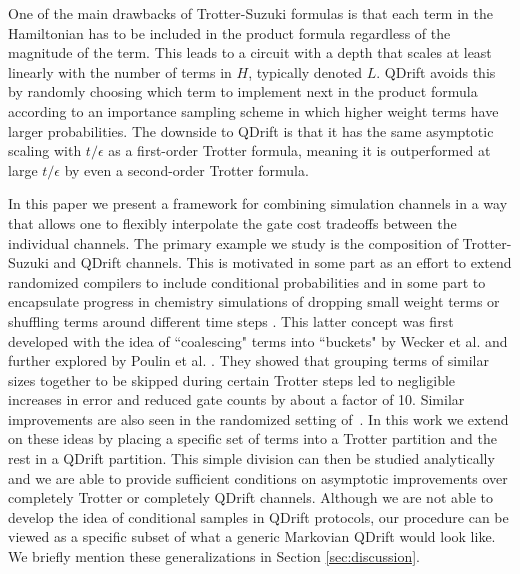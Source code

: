 One of the main drawbacks of Trotter-Suzuki formulas is that each term in the Hamiltonian has to be included in the product formula regardless of the magnitude of the term.  This leads
to a circuit with a depth that scales at least linearly with the number of terms in $H$, typically denoted $L$. QDrift avoids this by randomly choosing which
term to implement next in the product formula according to an importance sampling scheme in which higher weight terms have larger probabilities. The
downside to QDrift is that it has the same asymptotic scaling with $t/\epsilon$ as a first-order Trotter formula, meaning it is outperformed at large
$t/\epsilon$ by even a second-order Trotter formula. 

In this paper we present a framework for combining simulation channels in a way that allows one to flexibly interpolate the gate cost tradeoffs between the individual channels. The primary example we study is the composition of Trotter-Suzuki and QDrift channels. This is motivated in some part as an effort to extend 
randomized compilers to include conditional probabilities and in some part to encapsulate progress in chemistry simulations of dropping small
weight terms or shuffling terms around different time steps \cite{bucket_sim}. This latter concept was first developed with the idea of ``coalescing" terms into ``buckets" by Wecker et al. \cite{bucket_sim} and further explored by Poulin et al. \cite{coalescing_con_wiebe}. They showed that grouping terms of similar sizes together to be skipped during certain Trotter steps led to negligible increases in error and reduced gate counts by about a factor of 10.  Similar improvements are also seen in the randomized setting of~\cite{kivlichan2019phase}. In this work we extend on these ideas by placing a specific set of terms into a Trotter partition and the rest in a QDrift partition. This simple division can then be studied analytically and we are able to provide sufficient conditions on asymptotic improvements over completely Trotter or completely QDrift channels. Although we are not able to develop the idea of conditional samples in QDrift protocols, our 
procedure can be viewed as a specific subset of what a generic Markovian QDrift would look like. We briefly mention these generalizations in 
Section \ref*{sec:discussion}. 
 
